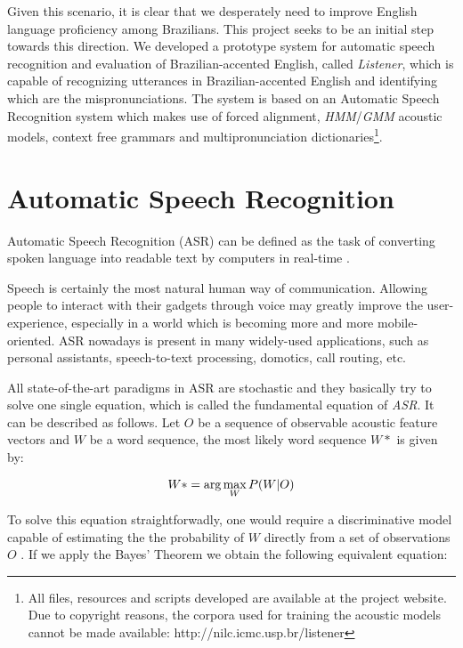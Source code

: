 \documentclass[twocolumn]{bmcart}%
\begin{document}
Given this scenario, it is clear that we desperately need to improve English language proficiency among Brazilians. This project seeks to be an initial step towards this direction. We developed a prototype system for automatic speech recognition and evaluation of Brazilian-accented English, called \emph{Listener}, which is capable of recognizing utterances in Brazilian-accented English and identifying which are the mispronunciations. The system is based on an Automatic Speech Recognition system which makes use of forced alignment, \emph{HMM}/\emph{GMM} acoustic models, context free grammars and multipronunciation dictionaries\footnote{All files, resources and scripts developed are available at the project website. Due to copyright reasons, the corpora used for training the acoustic models cannot be made available: http://nilc.icmc.usp.br/listener}.

\section*{Automatic Speech Recognition}\label{sec:speech-recognition}

Automatic Speech Recognition (ASR) can be defined as the task of converting spoken language into readable text by computers in real-time \cite{Huang2001}. 

Speech is certainly the most natural human way of communication. Allowing people to interact with their gadgets through voice may greatly improve the user-experience, especially in a world which is becoming more and more mobile-oriented.  ASR nowadays is present in many widely-used applications, such as personal assistants, speech-to-text processing, domotics, call routing, etc.

All state-of-the-art paradigms in ASR are stochastic and they basically try to solve one single equation, which is called the fundamental equation of \emph{ASR}. It can be described as follows. Let $O$ be a sequence of observable acoustic feature vectors and $W$ be a word sequence, the most likely word sequence $W*$ is given by:

\begin{equation}{\label{eq:fund-asr}}
W*= \arg\max_{W}P(W|O)
\end{equation}

To solve this equation straightforwadly, one would require a discriminative model
capable of estimating the the probability of $W$ directly from a set of observations $O$ \cite{Gales2008}.
If we apply the Bayes' Theorem we obtain the following equivalent equation:
\end{document}
